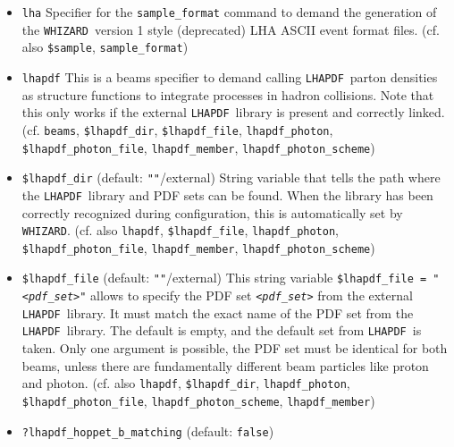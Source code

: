 \documentclass[12pt]{book}
\newcommand{\ttt}[1]{\texttt{#1}}
\newcommand{\whizard}{\texttt{WHIZARD}}
\newcommand{\lhapdf}{\texttt{LHAPDF}}
\begin{document}
\begin{itemize}
Real parameter that sets the value for $\Lambda_{QCD}$ used in the
internal evolution for running $\alpha_s$ in \whizard. (cf. also 
\ttt{alpha\_s\_is\_fixed}, \ttt{?alpha\_s\_from\_lhapdf},
\ttt{alpha\_s\_nf}, \ttt{?alpha\_s\_from\_pdf\_builtin}, 
\ttt{?alpha\_s\_from\_mz}, 
\ttt{?alpha\_s\_from\_lambda\_qcd}, \newline \ttt{alpha\_s\_order}) 
\item
\ttt{lha} \newline 
Specifier for the \ttt{sample\_format} command to demand the
generation of the \whizard\ version 1 style (deprecated) LHA ASCII event
format files. (cf. also \ttt{\$sample}, \newline
\ttt{sample\_format}) 
\item
\ttt{lhapdf} \newline
This is a beams specifier to demand calling \lhapdf\ parton densities as
structure functions to integrate processes in hadron collisions. Note
that this only works if the external \lhapdf\ library is present and
correctly linked. (cf. \ttt{beams}, \ttt{\$lhapdf\_dir},
\ttt{\$lhapdf\_file}, \ttt{lhapdf\_photon},
\ttt{\$lhapdf\_photon\_file}, \ttt{lhapdf\_member},
\ttt{lhapdf\_photon\_scheme}) 
\item
\ttt{\$lhapdf\_dir} \qquad (default: \ttt{""}/external) \newline
String variable that tells the path where the \lhapdf\ library and PDF
sets can be found. When the library has been correctly recognized
during configuration, this is automatically set by \whizard. (cf. also
\ttt{lhapdf}, \ttt{\$lhapdf\_file}, \ttt{lhapdf\_photon},
\ttt{\$lhapdf\_photon\_file}, \ttt{lhapdf\_member},
\ttt{lhapdf\_photon\_scheme}) 
\item
\ttt{\$lhapdf\_file} \qquad (default: \ttt{""}/external) \newline
This string variable \ttt{\$lhapdf\_file = "{\em <pdf\_set>}"} allows to
specify the PDF set \ttt{{\em <pdf\_set>}} from the external \lhapdf\
library. It must match the exact name of the PDF set
from the \lhapdf\ library. The default is empty, and the default set
from \lhapdf\ is taken. Only one argument is possible, the PDF set
must be identical for both beams, unless there are fundamentally
different beam particles like proton and photon. (cf. also
\ttt{lhapdf}, \ttt{\$lhapdf\_dir}, \ttt{lhapdf\_photon},
\ttt{\$lhapdf\_photon\_file}, \ttt{lhapdf\_photon\_scheme},
\ttt{lhapdf\_member}) 
\item
\ttt{?lhapdf\_hoppet\_b\_matching} \qquad (default: \ttt{false})

\end{itemize}
\end{document}
